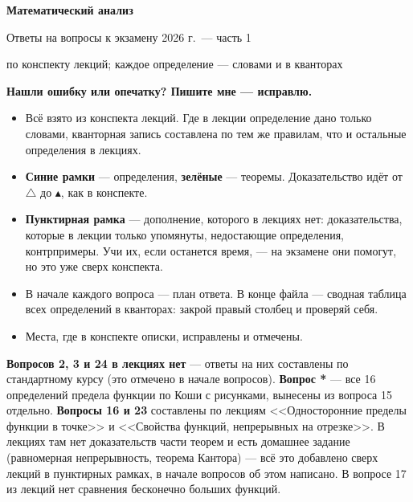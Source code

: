 \documentclass[a4paper,11pt]{article}
\newcommand{\oshibki}{%
  \begin{tcolorbox}[enhanced, colback=zamc!10, colframe=zamc, boxrule=1.2pt, arc=2pt,
    left=8pt, right=8pt, top=5pt, bottom=5pt]
    \centering\large\bfseries\textcolor{zamc!80!black}{Нашли ошибку или опечатку? Пишите мне --- исправлю.}
  \end{tcolorbox}}
\begin{document}
\thispagestyle{empty}
\begin{center}
  {\LARGE\bfseries Математический анализ}\par\medskip
  {\Large Ответы на вопросы к экзамену 2026 г.\ --- часть 1}\par\medskip
  {\normalsize по конспекту лекций; каждое определение --- словами и в кванторах}
\end{center}
\medskip
\oshibki
\medskip

\begin{tcolorbox}[colback=white, colframe=black!40, boxrule=0.4pt, arc=2pt,
  title={Как устроен этот файл}, fonttitle=\bfseries, colbacktitle=black!8, coltitle=black]
\begin{itemize}[leftmargin=*]
  \item Всё взято из конспекта лекций. Где в лекции определение дано только словами,
        кванторная запись составлена по тем же правилам, что и остальные определения в лекциях.
  \item \textcolor{oprc}{\textbf{Синие рамки}} --- определения, \textcolor{teoc}{\textbf{зелёные}} --- теоремы.
        Доказательство идёт от $\triangle$ до $\blacktriangle$, как в конспекте.
  \item \textbf{Пунктирная рамка} --- дополнение, которого в лекциях нет: доказательства,
        которые в лекции только упомянуты, недостающие определения, контрпримеры.
        Учи их, если останется время, --- на экзамене они помогут, но это уже сверх конспекта.
  \item В начале каждого вопроса --- план ответа. В конце файла --- сводная таблица всех
        определений в кванторах: закрой правый столбец и проверяй себя.
  \item Места, где в конспекте описки, исправлены и отмечены.
\end{itemize}
\end{tcolorbox}

\textbf{Вопросов 2, 3 и 24 в лекциях нет} --- ответы на них составлены по стандартному курсу (это отмечено в начале вопросов).
\textbf{Вопрос *} --- все 16 определений предела функции по Коши с рисунками, вынесены из вопроса 15 отдельно.
\textbf{Вопросы 16 и 23} составлены по лекциям <<Односторонние пределы функции в точке>> и <<Свойства функций,
непрерывных на отрезке>>. В лекциях там нет доказательств части теорем и есть домашнее задание (равномерная непрерывность,
теорема Кантора) --- всё это добавлено сверх лекций в пунктирных рамках, в начале вопросов об этом написано.
В вопросе 17 из лекций нет сравнения бесконечно больших функций.
\end{document}
